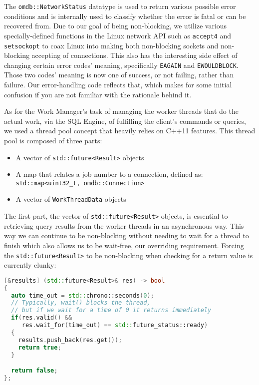 \documentclass[letterpaper, 12pt]{article}
\begin{document}
  The \lstinline[basicstyle=\ttfamily]|omdb::NetworkStatus| datatype is used to return various
  possible error conditions and is internally used to classify whether the error is fatal
  or can be recovered from. Due to our goal of being non-blocking, we utilize various specially-defined
  functions in the Linux network API such as \lstinline[basicstyle=\ttfamily]|accept4| and
  \lstinline[basicstyle=\ttfamily]|setsockopt| to coax Linux into making both non-blocking
  sockets and non-blocking accepting of connections. This also has the interesting side effect of
  changing certain error codes' meaning, specifically \lstinline[basicstyle=\ttfamily]|EAGAIN| and
  \lstinline[basicstyle=\ttfamily]|EWOULDBLOCK|. Those two codes' meaning is now one of success, or not
  failing, rather than failure. Our error-handling code reflects that, which makes for some initial
  confusion if you are not familiar with the rationale behind it.
  \par\vspace{\baselineskip}
  As for the Work Manager's task of managing the worker threads that do the actual work, via the
  SQL Engine, of fulfilling the client's commands or queries, we used a thread pool concept that
  heavily relies on C++11 features. This thread pool is composed of three parts:
  \begin{itemize}
   \item A vector of \lstinline[]|std::future<Result>| objects
   \item A map that relates a job number to a connection, defined as:\\
	 \lstinline[]|std::map<uint32_t, omdb::Connection>|
   \item A vector of \lstinline[]|WorkThreadData| objects
  \end{itemize}
  The first part, the vector of \lstinline|std::future<Result>| objects, is
  essential to retrieving query results from the worker threads in an asynchronous way. This way
  we can continue to be non-blocking without needing to wait for a thread to finish which also
  allows us to be wait-free, our overriding requirement. Forcing the \lstinline|std::future<Result>|
  to be non-blocking when checking for a return value is currently clunky:
  \begin{lstlisting}[language=C++]
[&results] (std::future<Result>& res) -> bool
{
  auto time_out = std::chrono::seconds(0);
  // Typically, wait() blocks the thread,
  // but if we wait for a time of 0 it returns immediately
  if(res.valid() &&
     res.wait_for(time_out) == std::future_status::ready)
  {
    results.push_back(res.get());
    return true;
  }

  return false;
};
  \end{lstlisting}
\end{document}
